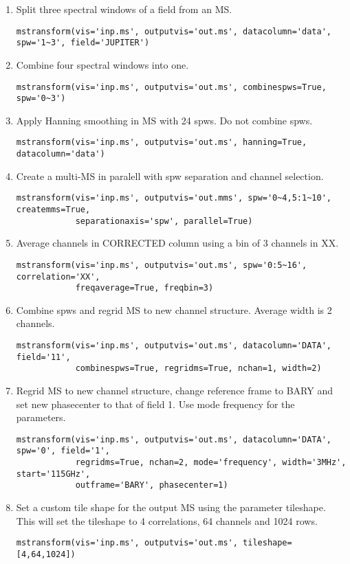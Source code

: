 \begin{enumerate}
\item Split three spectral windows of a field from an MS.
\begin{verbatim}
mstransform(vis='inp.ms', outputvis='out.ms', datacolumn='data', spw='1~3', field='JUPITER')
\end{verbatim}
\item Combine four spectral windows into one.
\begin{verbatim}
mstransform(vis='inp.ms', outputvis='out.ms', combinespws=True, spw='0~3')
\end{verbatim}
\item Apply Hanning smoothing in MS with 24 spws. Do not combine spws.
\begin{verbatim}
mstransform(vis='inp.ms', outputvis='out.ms', hanning=True, datacolumn='data')
\end{verbatim}
\item Create a multi-MS in paralell with spw separation and channel selection.
\begin{verbatim}
mstransform(vis='inp.ms', outputvis='out.mms', spw='0~4,5:1~10', createmms=True,
            separationaxis='spw', parallel=True)
\end{verbatim}
\item Average channels in CORRECTED column using a bin of 3 channels in XX.
\begin{verbatim}
mstransform(vis='inp.ms', outputvis='out.ms', spw='0:5~16', correlation='XX', 
            freqaverage=True, freqbin=3)
\end{verbatim}
\item Combine spws and regrid MS to new channel structure. Average width is 2 channels.
\begin{verbatim}
mstransform(vis='inp.ms', outputvis='out.ms', datacolumn='DATA', field='11',
            combinespws=True, regridms=True, nchan=1, width=2)
\end{verbatim}
\item Regrid MS to new channel structure, change reference frame to BARY and set
new phasecenter to that of field 1. Use mode frequency for the parameters.
\begin{verbatim}
mstransform(vis='inp.ms', outputvis='out.ms', datacolumn='DATA', spw='0', field='1', 
            regridms=True, nchan=2, mode='frequency', width='3MHz', start='115GHz', 
            outframe='BARY', phasecenter=1)
\end{verbatim}
\item Set a custom tile shape for the output MS using the parameter tileshape. This will
set the tileshape to 4 correlations, 64 channels and 1024 rows.
\begin{verbatim}
mstransform(vis='inp.ms', outputvis='out.ms', tileshape=[4,64,1024])
\end{verbatim}



\end{enumerate}

